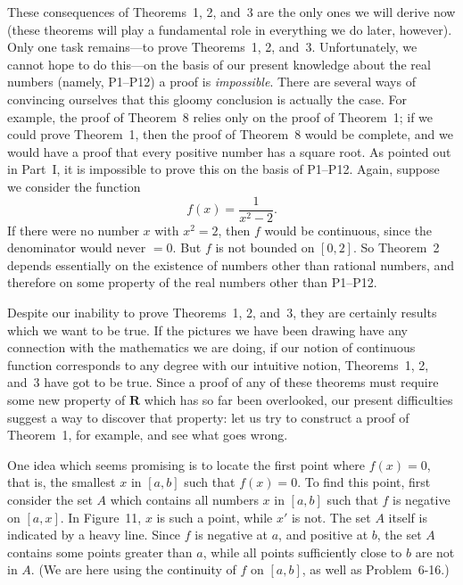 These consequences of Theorems~1, 2, and~3 are the only ones we will derive now
(these theorems will play a fundamental role in everything we do later,
however). Only one task remains---to prove Theorems~1, 2, and~3.
Unfortunately, we cannot hope to do this---on the basis of our present
knowledge about the real numbers (namely, P1--P12) a proof is
\emph{impossible}. There are several ways of convincing ourselves that this
gloomy conclusion is actually the case. For example, the proof of Theorem~8
relies only on the proof of Theorem~1; if we could prove Theorem~1, then the
proof of Theorem~8 would be complete, and we would have a proof that every
positive number has a square root. As pointed out in Part~I, it is impossible
to prove this on the basis of P1--P12. Again, suppose we consider the function
\[
f(x)=\frac{1}{x^2-2}.
\]
If there were no number $x$ with $x^2=2$, then $f$ would be continuous, since
the denominator would never $=0$. But $f$ is not bounded on $[0,2]$. So
Theorem~2 depends essentially on the existence of numbers other than rational
numbers, and therefore on some property of the real numbers other than
P1--P12.

Despite our inability to prove Theorems~1, 2, and~3, they are certainly results
which we want to be true. If the pictures we have been drawing have any
connection with the mathematics we are doing, if our notion of continuous
function corresponds to any degree with our intuitive notion, Theorems~1, 2,
and~3 have got to be true. Since a proof of any of these theorems must require
some new property of $\mathbf{R}$ which has so far been overlooked, our present
difficulties suggest a way to discover that property: let us try to construct a
proof of Theorem~1, for example, and see what goes wrong.

One idea which seems promising is to locate the first point where $f(x)=0$,
that is, the smallest $x$ in $[a,b]$ such that $f(x)=0$. To find this point,
first consider the set $A$ which contains all numbers $x$ in $[a,b]$ such that
$f$ is negative on $[a,x]$. In Figure~11, $x$ is such a point, while $x'$ is
not. The set $A$ itself is indicated by a heavy line. Since $f$ is negative at
$a$, and positive at $b$, the set $A$ contains some points greater than $a$,
while all points sufficiently close to $b$ are not in $A$. (We are here using
the continuity of $f$ on $[a,b]$, as well as Problem~6-16.)
\begin{center}
\\[0.6em]
\end{center}

